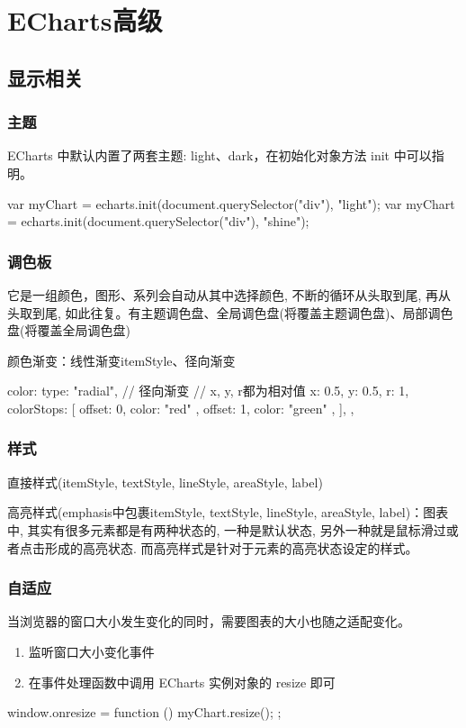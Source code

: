 \section{ECharts高级}
\subsection{显示相关}
\subsubsection{主题}
ECharts 中默认内置了两套主题: light、dark，在初始化对象方法 init 中可以指明。
\begin{js}
var myChart = echarts.init(document.querySelector("div"), "light");
var myChart = echarts.init(document.querySelector("div"), "shine");
\end{js}
\subsubsection{调色板}
它是一组颜色，图形、系列会自动从其中选择颜色, 不断的循环从头取到尾, 再从头取到尾, 如此往复。有主题调色盘、全局调色盘(将覆盖主题调色盘)、局部调色盘(将覆盖全局调色盘)

颜色渐变：线性渐变itemStyle、径向渐变
\begin{js}
color: {
    type: "radial", // 径向渐变
    // x, y, r都为相对值
    x: 0.5,
    y: 0.5,
    r: 1,
    colorStops: [
        { offset: 0, color: "red" },
        { offset: 1, color: "green" },
    ],
},
\end{js}
\subsubsection{样式}
直接样式(itemStyle, textStyle, lineStyle, areaStyle, label)

高亮样式(emphasis中包裹itemStyle, textStyle, lineStyle, areaStyle, label)：图表中, 其实有很多元素都是有两种状态的, 一种是默认状态, 另外一种就是鼠标滑过或者点击形成的高亮状态. 而高亮样式是针对于元素的高亮状态设定的样式。
\subsubsection{自适应}
当浏览器的窗口大小发生变化的同时，需要图表的大小也随之适配变化。

\begin{enumerate}
    \item 监听窗口大小变化事件
    \item 在事件处理函数中调用 ECharts 实例对象的 resize 即可
\end{enumerate}
\begin{js}
window.onresize = function () {
myChart.resize();
};
\end{js}
